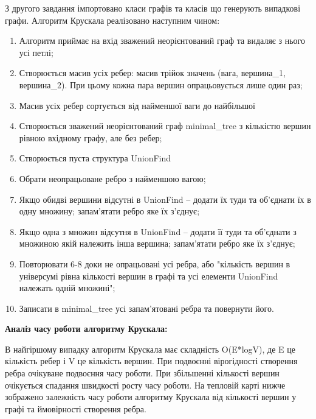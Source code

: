 \documentclass{article}
\begin{document}
З другого завдання імпортовано класи графів та класів що генерують випадкові графи. Алгоритм Крускала реалізовано наступним чином:
\begin{enumerate}
\item Алгоритм приймає на вхід зважений неорієнтований граф та видаляє з нього усі петлі;
\item Створюється масив усіх ребер: масив трійок значень (вага, вершина\_1, вершина\_2). При цьому кожна пара вершин опрацьовується лише один раз;
\item Масив усіх ребер сортується від найменшої ваги до найбільшої
\item Створюється зважений неорієнтований граф minimal\_tree з кількістю вершин рівною вхідному графу, але без ребер;
\item Створюється пуста структура UnionFind
\item Обрати неопрацьоване ребро з найменшою вагою;
\item Якщо обидві вершини відсутні в UnionFind -- додати їх туди та об'єднати їх в одну множину; запам'ятати ребро яке їх з'єднує;
\item Якщо одна з множин відсутня в UnionFind -- додати її туди та об'єднати з множиною якій належить інша вершина; запам'ятати ребро яке їх з'єднує;
\item Повторювати 6-8 доки не опрацьовані усі ребра, або "кількість вершин в універсумі рівна кількості вершин в графі та усі елементи UnionFind належать одній множині";
\item Записати в minimal\_tree усі запам'ятовані ребра та повернути його.
\end{enumerate}

\textbf{Аналіз часу роботи алгоритму Крускала:}\\\indent

В найгіршому випадку алгоритм Крускала має складність O(E*logV), де E це кількість ребер і V це кількість вершин. При подвоєнні вірогідності створення ребра очікуване подвоєння часу роботи. При збільшенні кількості вершин очікується спадання швидкості росту часу роботи. На тепловій карті нижче зображено залежність часу роботи алгоритму Крускала від кількості вершин у графі та ймовірності створення ребра.
\end{document}
